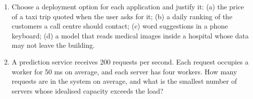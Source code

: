 \begin{enumerate}[label=\textbf{5.\arabic*},ref=5.\arabic*,leftmargin=*,itemsep=6pt]
  \item\label{exr5:choose} Choose a deployment option for each application and justify it: (a) the price of a
        taxi trip quoted when the user asks for it; (b) a daily ranking of the customers a call centre should
        contact; (c) word suggestions in a phone keyboard; (d) a model that reads medical images inside a
        hospital whose data may not leave the building.
  \item\label{exr5:little} A prediction service receives 200 requests per second. Each request occupies a worker for
        50 ms on average, and each server has four workers. How many requests are in the system on average,
        and what is the smallest number of servers whose idealised capacity exceeds the load?


\end{enumerate}

